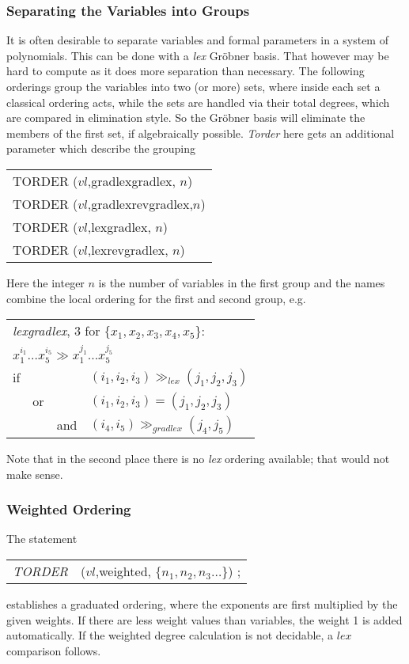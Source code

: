 \subsubsection{Separating the Variables into Groups }
It is often desirable to separate variables
and formal parameters in a system of polynomials.
This can be done with a {\it lex} Gr\"obner
basis.  That however may be hard to compute as it does more
separation than necessary. The following orderings group the
variables into two (or more) sets, where inside each set a classical
ordering acts, while the sets are handled via their total degrees,
which are compared in elimination style. So the Gr\"obner basis will
eliminate the members of the first set, if algebraically possible.
{\it Torder} here gets an additional parameter which describe the
grouping 
\begin{center}{\it
\begin{tabular}{l}
TORDER ($vl$,gradlexgradlex, $n$) \\
TORDER ($vl$,gradlexrevgradlex,$n$) \\
TORDER ($vl$,lexgradlex, $n$) \\
TORDER ($vl$,lexrevgradlex, $n$)
\end{tabular}}
\end{center}
Here the integer $n$ is the number of variables in the first group
and the names combine the local ordering for the first and second
group, e.g.
\begin{center}
\begin{tabular}{llll}
\multicolumn{4}{l}{{\it lexgradlex}, 3 for $\{x_1,x_2,x_3,x_4,x_5\}$:} \\
\multicolumn{4}{l}{$x_1^{i_1}\ldots x_5^{i_5} \gg x_1^{j_1}\ldots
x_5^{j_5}$} \\
if & & & $(i_1,i_2,i_3) \gg_{lex}(j_1,j_2,j_3)$ \\
& or & & $(i_1,i_2,i_3) = (j_1,j_2,j_3)$ \\
& & and & $(i_4,i_5) \gg_{gradlex}(j_4,j_5)$
\end{tabular}
\end{center}
Note that in the second place there is no {\it lex} ordering available;
that would not make sense.

\subsubsection{Weighted Ordering}
 
The statement
\begin{center}
\begin{tabular}{cl}
{\it TORDER} &($vl$,weighted, $\{n_1,n_2,n_3  \ldots$\}) ; \\
\end{tabular}
\end{center}
establishes a graduated ordering, where the exponents are first
multiplied by the given weights. If there are less weight values than
variables, the weight 1 is added automatically. If the weighted
degree calculation is not decidable, a $lex$ comparison follows.


